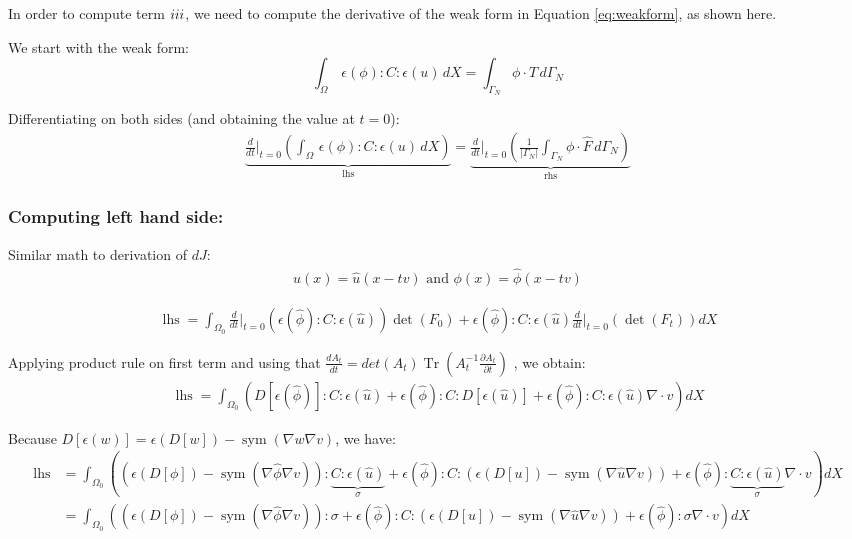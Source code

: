 \documentclass[11pt]{article}
\DeclareMathOperator{\Tr}{Tr}
\DeclareMathOperator{\sym}{sym}
\DeclareMathOperator{\lhs}{lhs}
\newcommand{\RNum}[1]{\uppercase\expandafter{\romannumeral #1\relax}}
\begin{document}
In order to compute term $\RNum{3}$, we need to compute the derivative of the weak form in Equation \ref{eq:weakform}, as shown here.

We start with the weak form:
$$
\int_\Omega\, \epsilon(\phi) : C : \epsilon(u)\, dX = \int_{\Gamma_N} \phi \cdot \hat T\, d\Gamma_N
$$

Differentiating on both sides (and obtaining the value at $t=0$):
\begin{align*}
  \underbrace{\frac{d}{dt} \Big|_{t=0} \left( \int_\Omega\, \epsilon(\phi) : C : \epsilon(u)\, dX \right)}_{\text{lhs}} = \underbrace{\frac{d}{dt} \Big|_{t=0} \left(\frac{1}{|\Gamma_N|} \int_{\Gamma_N} \phi \cdot \hat F\, d\Gamma_N\right)}_{\text{rhs}}
\end{align*}

\subsubsection{Computing left hand side:}
Similar math to derivation of $dJ$:
\begin{align*}
  u(x) = \hat u(x - tv) \text{ and } \phi(x) = \hat \phi(x - tv)  
\end{align*}
  
\begin{align*}
  \lhs = \int_{\Omega_0} \frac{d}{dt}\Big|_{t=0}  \left( \epsilon(\hat \phi):C:\epsilon(\hat u) \right) \det(F_0) + \epsilon(\hat \phi):C:\epsilon(\hat u) \frac{d}{dt} \Big|_{t=0} \left(\det(F_t)\right) dX
\end{align*}

Applying product rule on first term and using that $\frac{dA_t}{dt} = det(A_t)\Tr(A_t^{-1} \frac{\partial A_t}{\partial t})$ , we obtain:
\begin{align*}
  \lhs = \int_{\Omega_0} \left( D[\epsilon(\hat \phi)]:C:\epsilon(\hat u) + \epsilon(\hat \phi):C:D[\epsilon(\hat u)] + \epsilon(\hat \phi): C : \epsilon(\hat u) \nabla \cdot v \right) dX
\end{align*}

Because $D[\epsilon(w)] = \epsilon(D[w])  - \sym(\nabla w \nabla v)$, we have:
\begin{align*}
  \lhs &=  \int_{\Omega_0} \left((\epsilon(D[\phi])  - \sym(\nabla \hat \phi \nabla v)):\underbrace{C:\epsilon(\hat u)}_{\sigma} + \epsilon(\hat \phi):C:(\epsilon(D[u])  - \sym(\nabla \hat u \nabla v)) + \epsilon(\hat \phi): \underbrace{C : \epsilon(\hat u)}_{\sigma} \nabla \cdot v \right) dX\\
  &= \int_{\Omega_0} \left((\epsilon(D[\phi])  - \sym(\nabla \hat \phi \nabla v)):\sigma + \epsilon(\hat \phi):C:(\epsilon(D[u])  - \sym(\nabla \hat u \nabla v)) + \epsilon(\hat \phi): \sigma \nabla \cdot v \right) dX
\end{align*}
\end{document}
